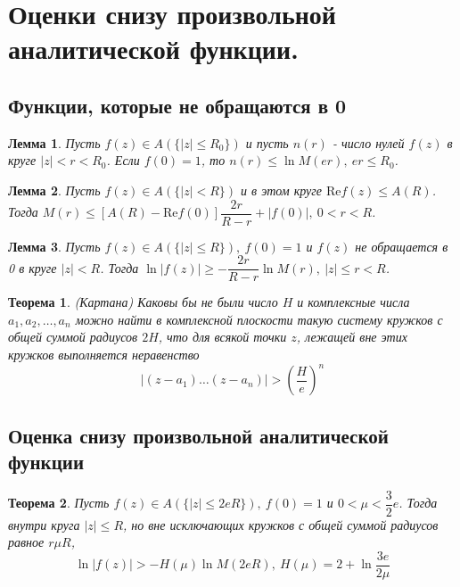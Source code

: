 \documentclass[9pt]{article}
\newtheorem{theorem}{Теорема} %
\newtheorem{lemma}{Лемма} %
\begin{document}
		\section{Оценки снизу произвольной аналитической функции.}
			\subsection*{Функции, которые не обращаются в 0}
			\begin{lemma}
				Пусть $f(z) \in A(\{|z| \leq R_0\})$ и пусть $n(r)$ - число нулей $f(z)$ в круге $|z| < r < R_0$. Если $f(0) = 1$, то $n(r) \leq \ln{M(er)}, \ er \leq R_0$.
			\end{lemma}
			\begin{lemma}
				Пусть $f(z) \in A(\{|z| < R\})$ и в этом круге $\mathrm{Re}f(z) \leq A(R)$. Тогда $M(r) \leq \left[	A(R) - \mathrm{Re} f(0)\right]\dfrac{2r}{R-r} + |f(0)|, \ 0 < r < R$.
			\end{lemma}
			\begin{lemma}
				Пусть $f(z) \in A(\{|z| \leq R\}), \ f(0) = 1$ и $f(z)$ не обращается в 0 в круге $|z| < R$. Тогда $\ln{|f(z)|} \geq -\dfrac{2r}{R-r} \ln{M(r)}, \ |z| \leq r < R$.
			\end{lemma}
			\begin{theorem} (Картана)\newline
				Каковы бы не были число $H$ и комплексные числа $a_1, a_2, \dots, a_n$ можно найти в комплексной плоскости такую систему кружков с общей суммой радиусов $2H$, что для всякой точки $z$, лежащей вне этих кружков выполняется неравенство
				$$
				|(z-a_1) \dots (z-a_n)| > \left(\dfrac{H}{e}\right)^n
				$$
			\end{theorem}
			\subsection*{Оценка снизу произвольной аналитической функции}
			\begin{theorem}
				Пусть $f(z) \in A(\{|z| \leq 2eR\}), \ f(0) = 1$ и $0 < \mu < \dfrac32 e$. Тогда внутри круга $|z| \leq R$, но вне исключающих кружков с общей суммой радиусов равное $r\mu R$, $$\ln{|f(z)|} > - H(\mu) \ln{M(2eR)}, \ H(\mu) = 2 + \ln{\dfrac{3e}{2\mu}}$$
			\end{theorem}
\end{document}
